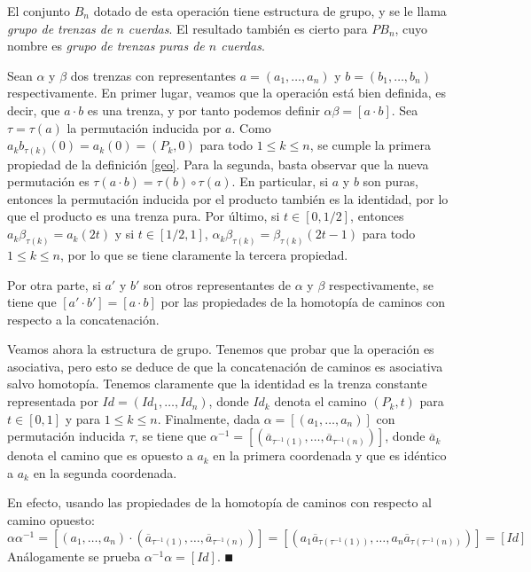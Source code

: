 \documentclass[TFG.tex]{subfiles}
\begin{document}
\begin{prop}
El conjunto $B_n$ dotado de esta operación tiene estructura de grupo, y se le llama \emph{grupo de trenzas de $n$ cuerdas}. El resultado también es cierto para $PB_n$, cuyo nombre es \emph{grupo de trenzas puras de $n$ cuerdas}. 
\end{prop}

\begin{dem}
Sean $\alpha$ y $\beta$ dos trenzas con representantes $a=(a_1,\dots, a_n)$ y $b=(b_1,\dots, b_n)$ respectivamente. En primer lugar, veamos que la operación está bien definida, es decir, que $a\cdot b$ es una trenza, y por tanto podemos definir $\alpha\beta=[a\cdot b]$. Sea $\tau=\tau(a)$ la permutación inducida por $a$. Como $a_kb_{\tau(k)}(0)=a_k(0)=(P_k,0)$ para todo $1\leq k\leq n$, se cumple la primera propiedad de la definición \ref{geo}. Para la segunda, basta observar que la nueva permutación es $\tau(a\cdot b)=\tau(b)\circ \tau(a)$. En particular, si $a$ y $b$ son puras, entonces la permutación inducida por el producto también es la identidad, por lo que el producto es una trenza pura. Por último, si $t\in[0,1/2]$, entonces $a_k\beta_{\tau(k)}=a_k(2t)$ y si $t\in [1/2,1]$, $\alpha_k\beta_{\tau(k)}=\beta_{\tau(k)}(2t-1)$ para todo $1\leq k\leq n$, por lo que se tiene claramente la tercera propiedad. 

Por otra parte, si $a'$ y $b'$ son otros representantes de $\alpha$ y $\beta$ respectivamente, se tiene que $[a'\cdot b']=[a\cdot b]$ por las propiedades de la homotopía de caminos con respecto a la concatenación.

Veamos ahora la estructura de grupo. Tenemos que probar que la operación es asociativa, pero esto se deduce de que la concatenación de caminos es asociativa salvo homotopía.
Tenemos claramente que la identidad es la trenza constante representada por $Id=(Id_1,\dots, Id_n)$, donde $Id_k$ denota el camino $(P_k, t)$ para $t\in[0,1]$ y para $1\leq k\leq n$.
Finalmente, dada $\alpha=[(a_1,\dots, a_n)]$ con permutación inducida $\tau$, se tiene que $\alpha^{-1}=[(\overline{a}_{\tau^{-1}(1)},\dots, \overline{a}_{\tau^{-1}(n)})]$, donde $\overline{a}_k$ denota el camino que es opuesto a $a_k$ en la primera coordenada y que es idéntico a $a_k$ en la segunda coordenada. 

En efecto, usando las propiedades de la homotopía de caminos con respecto al camino opuesto:
\[
\alpha\alpha^{-1}=[(a_1,\dots, a_n)\cdot (\overline{a}_{\tau^{-1}(1)},\dots, \overline{a}_{\tau^{-1}(n)})]=[(a_1\overline{a}_{\tau(\tau^{-1}(1))},\dots, a_n\overline{a}_{\tau(\tau^{-1}(n))})]=[Id]
\]
Análogamente se prueba $\alpha^{-1}\alpha=[Id]$. 
$\QED$
\end{dem}
\end{document}
